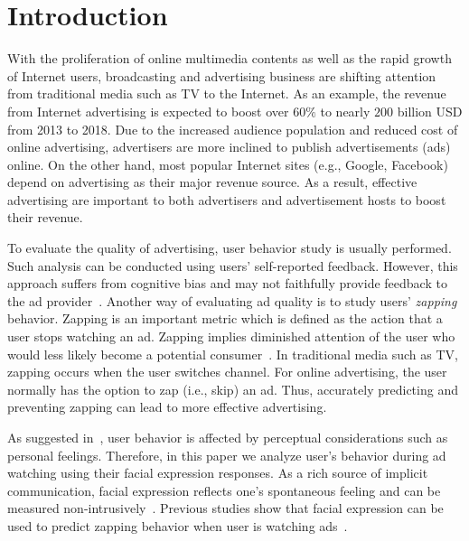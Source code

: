 \documentclass[10pt,journal,cspaper,compsoc]{IEEEtran}
\begin{document}
\maketitle

\IEEEdisplaynotcompsoctitleabstractindextext
\IEEEpeerreviewmaketitle

\section{Introduction}
With the proliferation of online multimedia contents as well as the rapid growth of Internet users, broadcasting and advertising business are shifting attention from traditional media such as TV to the Internet. As an example, the revenue from Internet advertising is expected to boost over $60\%$ to nearly $200$ billion USD from 2013 to 2018. Due to the increased audience population and reduced cost of online advertising, advertisers are more inclined to publish advertisements (ads) online. On the other hand, most popular Internet sites (e.g., Google, Facebook) depend on advertising as their major revenue source. As a result, effective advertising are important to both advertisers and advertisement hosts to boost their revenue.

To evaluate the quality of advertising, user behavior study is usually performed. Such analysis can be conducted using users' self-reported feedback. However, this approach suffers from cognitive bias and may not faithfully provide feedback to the ad provider~\cite{Poels06}. Another way of evaluating ad quality is to study users' \textit{zapping} behavior. Zapping is an important metric which is defined as the action that a user stops watching an ad. Zapping implies diminished attention of the user who would less likely become a potential consumer~\cite{Elpers03}. In traditional media such as TV, zapping occurs when the user switches channel. For online advertising, the user normally has the option to zap (i.e., skip) an ad. Thus, accurately predicting and preventing zapping can lead to more effective advertising. 

As suggested in~\cite{Abbasi_15}, user behavior is affected by perceptual considerations such as personal feelings. Therefore, in this paper we analyze user's behavior during ad watching using their facial expression responses. As a rich source of implicit communication, facial expression reflects one's spontaneous feeling and can be measured non-intrusively~\cite{Ekman93}. Previous studies show that facial expression can be used to predict zapping behavior when user is watching ads~\cite{Yang_TAC14, Yang_FG15}.  
\end{document}
